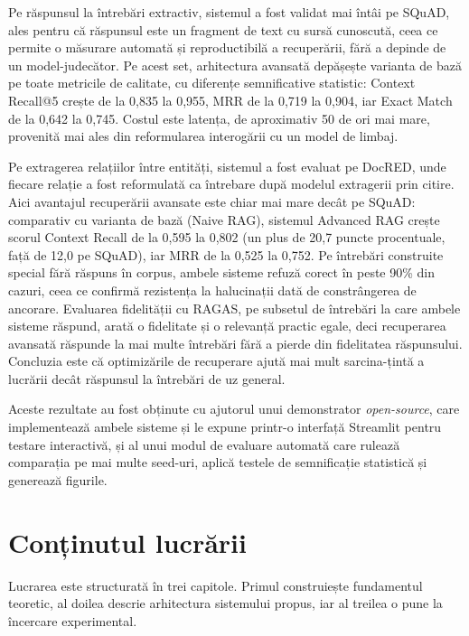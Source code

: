 Pe răspunsul la întrebări extractiv, sistemul a fost validat mai întâi pe SQuAD, ales pentru că răspunsul este un fragment de text cu sursă cunoscută, ceea ce permite o măsurare automată și reproductibilă a recuperării, fără a depinde de un model-judecător. Pe acest set, arhitectura avansată depășește varianta de bază pe toate metricile de calitate, cu diferențe semnificative statistic: Context Recall@5 crește de la 0,835 la 0,955, MRR de la 0,719 la 0,904, iar Exact Match de la 0,642 la 0,745. Costul este latența, de aproximativ 50 de ori mai mare, provenită mai ales din reformularea interogării cu un model de limbaj.

Pe extragerea relațiilor între entități, sistemul a fost evaluat pe DocRED, unde fiecare relație a fost reformulată ca întrebare după modelul extragerii prin citire. Aici avantajul recuperării avansate este chiar mai mare decât pe SQuAD: comparativ cu varianta de bază (Naive RAG), sistemul Advanced RAG crește scorul Context Recall de la 0,595 la 0,802 (un plus de 20,7 puncte procentuale, față de 12,0 pe SQuAD), iar MRR de la 0,525 la 0,752. Pe întrebări construite special fără răspuns în corpus, ambele sisteme refuză corect în peste 90\% din cazuri, ceea ce confirmă rezistența la halucinații dată de constrângerea de ancorare. Evaluarea fidelității cu RAGAS, pe subsetul de întrebări la care ambele sisteme răspund, arată o fidelitate și o relevanță practic egale, deci recuperarea avansată răspunde la mai multe întrebări fără a pierde din fidelitatea răspunsului. Concluzia este că optimizările de recuperare ajută mai mult sarcina-țintă a lucrării decât răspunsul la întrebări de uz general.

Aceste rezultate au fost obținute cu ajutorul unui demonstrator \textit{open-source}, care implementează ambele sisteme și le expune printr-o interfață Streamlit pentru testare interactivă, și al unui modul de evaluare automată care rulează comparația pe mai multe seed-uri, aplică testele de semnificație statistică și generează figurile.

\section*{Conținutul lucrării}

Lucrarea este structurată în trei capitole. Primul construiește fundamentul teoretic, al doilea descrie arhitectura sistemului propus, iar al treilea o pune la încercare experimental.

